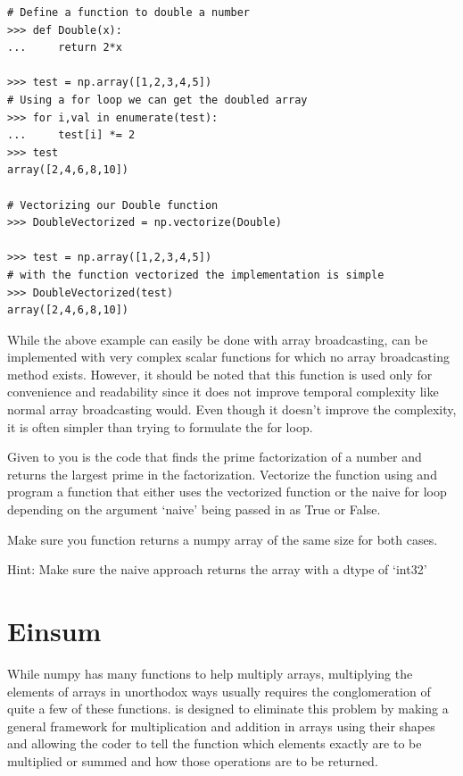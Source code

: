 \begin{lstlisting}
# Define a function to double a number
>>> def Double(x):           
...		return 2*x

>>> test = np.array([1,2,3,4,5])
# Using a for loop we can get the doubled array
>>> for i,val in enumerate(test):   
...		test[i] *= 2
>>> test
array([2,4,6,8,10])

# Vectorizing our Double function
>>> DoubleVectorized = np.vectorize(Double)   

>>> test = np.array([1,2,3,4,5])
# with the function vectorized the implementation is simple
>>> DoubleVectorized(test)     
array([2,4,6,8,10])

\end{lstlisting}

\begin{info} %

While the above example can easily be done with array broadcasting,  can be implemented with very complex scalar functions for which no array broadcasting method exists. However, it should be noted that this function is used only for convenience and readability since it does not improve temporal complexity like normal array broadcasting would. Even though it doesn't improve the complexity, it is often simpler than trying to formulate the for loop.

\end{info}

\begin{problem}

Given to you is the code that finds the prime factorization of a number and returns the largest prime in the factorization. Vectorize the function using  and program a function that either uses the vectorized function or the naive for loop depending on the argument `naive' being passed in as True or False. 

Make sure you function returns a numpy array of the same size for both cases.

\noindent Hint: Make sure the naive approach returns the array with a dtype of `int32'

\end{problem}

\section*{Einsum}

While numpy has many functions to help multiply arrays, multiplying the elements of arrays in unorthodox ways usually requires the conglomeration of quite a few of these functions.  is designed to eliminate this problem by making a general framework for multiplication and addition in arrays using their shapes and allowing the coder to tell the function which elements exactly are to be multiplied or summed and how those operations are to be returned.


